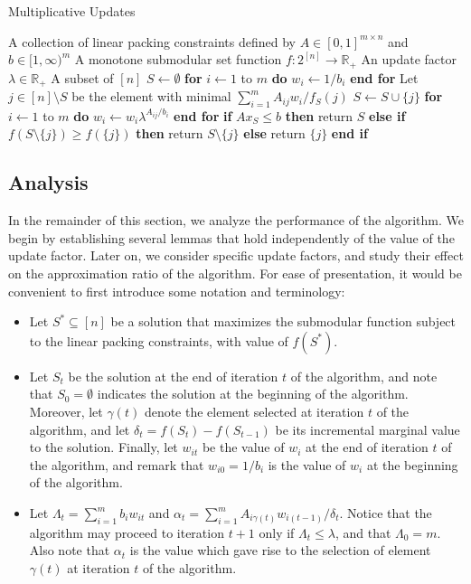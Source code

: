 \documentclass[11pt]{article}
\theoremstyle{plain}
\theoremstyle{definition}
\newcommand{\bbR}{\mathbb{R}}
\begin{document}
\begin{algorithm}
\caption{Multiplicative Updates}\label{cap:MultiplicativeUpdates}\begin{algorithmic}[1]
\Require A collection of linear packing constraints defined by $A \in [0,1]^{m \times n}$ and $b \in [1,\infty)^m$ \Statex \qquad\; A monotone submodular set function $f: 2^{[n]} \rightarrow \bbR_{+}$ \Statex \qquad\; An update factor $\lambda \in \bbR_+$ \Ensure A subset of $[n]$ \smallskip 
\State $S \leftarrow \emptyset$ \State \textbf{for} $i \leftarrow 1$ to $m$ \textbf{do} $w_i \leftarrow 1 / b_i$ \textbf{end for} \smallskip 
{} \label{alg:StopCond} \State Let $j \in [n] \setminus S$ be the element with minimal $\sum_{i=1}^{m} A_{ij}w_i / f_S(j)$ \State $S \leftarrow S \cup \{j\}$ \State \textbf{for} $i \leftarrow 1$ to $m$ \textbf{do} $w_i \leftarrow w_i \lambda^{A_{ij}/b_i}$ \textbf{end for} \label{alg:WeightUpdate} \EndWhile \smallskip 
\State \textbf{if} $Ax_S \leq b$ \textbf{then} return $S$ \State \textbf{else if} $f(S \setminus \{j\}) \geq f(\{j\})$ \textbf{then} return $S \setminus \{j\}$ \State \textbf{else} return $\{j\}$ \textbf{end if} \end{algorithmic}
\end{algorithm}


\subsection{Analysis} \label{subsec:Analysis}
In the remainder of this section, we analyze the performance of
the algorithm. We begin by establishing several lemmas that hold
independently of the value of the update factor. Later on, we
consider specific update factors, and study their effect on the
approximation ratio of the algorithm. For ease of presentation, it
would be convenient to first introduce some notation and
terminology:
\begin{itemize}
\item Let $S^* \subseteq [n]$ be a solution that maximizes the
submodular function subject to the linear packing constraints,
with value of $f(S^*)$.

\item Let $S_t$ be the solution at the end of iteration $t$ of the
algorithm, and note that $S_0 = \emptyset$ indicates the solution
at the beginning of the algorithm. Moreover, let $\gamma(t)$
denote the element selected at iteration $t$ of the algorithm, and
let $\delta_t = f(S_t) - f(S_{t-1})$ be its incremental marginal
value to the solution. Finally, let $w_{it}$ be the value of $w_i$
at the end of iteration $t$ of the algorithm, and remark that
$w_{i0} = 1 / b_i$ is the value of $w_i$ at the beginning of the
algorithm.

\item Let $\Lambda_t = \sum_{i = 1}^m b_i w_{it}$ and $\alpha_t =
\sum_{i=1}^{m} A_{i\gamma(t)}w_{i(t-1)} / \delta_{t}$. Notice that
the algorithm may proceed to iteration $t+1$ only if $\Lambda_t
\leq \lambda$, and that $\Lambda_0 = m$. Also note that $\alpha_t$
is the value which gave rise to the selection of element
$\gamma(t)$ at iteration $t$ of the algorithm.
\end{itemize}
\end{document}
